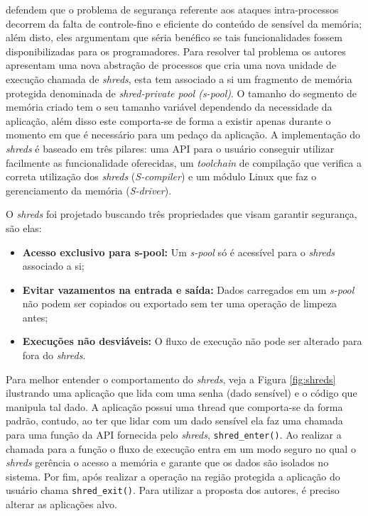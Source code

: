 \cite{shreds} defendem que o problema de segurança referente aos ataques
intra-processos decorrem da falta de controle-fino e eficiente do conteúdo de
sensível da memória; além disto, eles argumentam que séria benéfico se tais
funcionalidades fossem disponibilizadas para os programadores.  Para resolver tal
problema os autores apresentam uma nova abstração de processos que cria uma
nova unidade de execução chamada de \emph{shreds}, esta tem associado a si um
fragmento de memória protegida denominada de \emph{shred-private pool
(s-pool)}. O tamanho do segmento de memória criado tem o seu tamanho variável
dependendo da necessidade da aplicação, além disso este comporta-se de forma a
existir apenas durante o momento em que é necessário para um pedaço da
aplicação. A implementação do \emph{shreds} é baseado em três pilares: uma API
para o usuário conseguir utilizar facilmente as funcionalidade oferecidas, um
\emph{toolchain} de compilação que verifica a correta utilização dos
\emph{shreds} (\emph{S-compiler}) e um módulo Linux que faz o gerenciamento da
memória (\emph{S-driver}).

O \emph{shreds} foi projetado buscando três propriedades que visam garantir
segurança, são elas:

\begin{itemize}
  \item \textbf{Acesso exclusivo para s-pool:} Um \emph{s-pool} só é acessível
        para o \emph{shreds} associado a si;
  \item \textbf{Evitar vazamentos na entrada e saída:} Dados carregados em um
        \emph{s-pool} não podem ser copiados ou exportado sem ter uma operação
        de limpeza antes;
  \item \textbf{Execuções não desviáveis:} O fluxo de execução não pode ser
        alterado para fora do \emph{shreds}.
\end{itemize}

Para melhor entender o comportamento do \emph{shreds}, veja a Figura
\ref{fig:shreds} ilustrando uma aplicação que lida com uma senha (dado
sensível) e o código que manipula tal dado. A aplicação possui uma thread que
comporta-se da forma padrão, contudo, ao ter que lidar com um dado sensível ela
faz uma chamada para uma função da API fornecida pelo \emph{shreds},
\texttt{shred\_enter()}. Ao realizar a chamada para a função o fluxo de
execução entra em um modo seguro no qual o \emph{shreds} gerência o acesso a
memória e garante que os dados são isolados no sistema. Por fim, após realizar
a operação na região protegida a aplicação do usuário chama
\texttt{shred\_exit()}. Para utilizar a proposta dos autores, é preciso alterar
as aplicações alvo.


